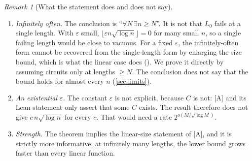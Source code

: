 \documentclass[10pt]{amsart}
\theoremstyle{plain}
\theoremstyle{definition}
\theoremstyle{remark}
\newtheorem{remark}[theorem]{Remark}
\numberwithin{equation}{section}
\newcommand{\A}{\textup{[A]}}
\begin{document}
\begin{remark}[What the statement does and does not say]\label{rem:form}
\leavevmode
\begin{enumerate}[label=\textup{(\alph*)}]
\item \emph{Infinitely often.} The conclusion is ``$\forall N\,\exists n\ge N$''. It is not that
$L_0$ fails at a single length. With $\varepsilon$ small, $\lfloor\varepsilon n\sqrt{\log n}\rfloor=0$
for many small $n$, so a single failing length would be close to vacuous. For a fixed $\varepsilon$,
the infinitely-often form cannot be recovered from the single-length form by enlarging the size
bound, which is what the linear case does (). We prove it directly by
assuming circuits only at lengths $\ge N$. The conclusion does not say that the bound holds for
almost every $n$ (\cref{sec:limits}).
\item \emph{An existential $\varepsilon$.} The constant $\varepsilon$ is not explicit, because $C$
is not: \A{} and its Lean statement only assert that some $C$ exists. The result therefore does not
give $c\,n\sqrt{\log n}$ for every $c$. That would need a rate $2^{o(M/\sqrt{\log M})}$.
\item \emph{Strength.} The theorem implies the linear-size statement of \A, and it is strictly more
informative: at infinitely many lengths, the lower bound grows faster than every linear function.
\end{enumerate}
\end{remark}
\end{document}
